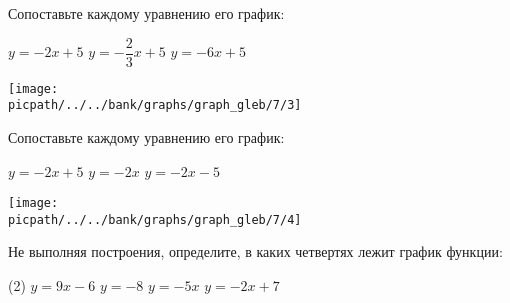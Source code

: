 \begin{class}[number=1]
\begin{listofex}
		\begin{minipage}[t]{\bodywidth}
			Сопоставьте каждому уравнению его график:
			\begin{tasks}
				\task \( y=-2x+5 \)
				\task \( y=-\dfrac{ 2 }{ 3 }x+5 \)
				\task \( y=-6x+5 \)
			\end{tasks}
		\end{minipage}
		\gapwidth
		\begin{minipage}[t]{\picwidth}
			\texttt{[image: \\picpath/../../bank/graphs/graph\_gleb/7/3]}
		\end{minipage}
		\item 
		\begin{minipage}[t]{\bodywidth}
			Сопоставьте каждому уравнению его график:
			\begin{tasks}
				\task \( y=-2x+5 \)
				\task \( y=-2x \)
				\task \( y=-2x-5 \)
			\end{tasks}
		\end{minipage}
		\gapwidth
		\begin{minipage}[t]{\picwidth}
			\texttt{[image: \\picpath/../../bank/graphs/graph\_gleb/7/4]}
		\end{minipage}
		\item Не выполняя построения, определите, в каких четвертях лежит график
		функции:
		\begin{tasks}(2)
			\task \( y=9x-6 \)
			\task \( y=-8 \)
			\task \( y=-5x \)
			\task \( y=-2x+7 \)
		\end{tasks}
		
	\end{listofex}
\end{class}

